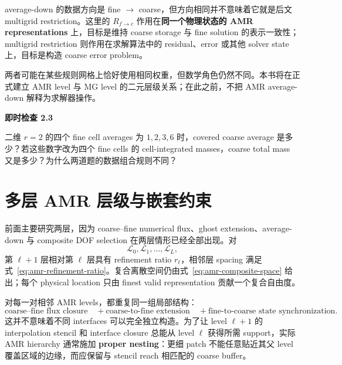 average-down 的数据方向是 fine $\rightarrow$ coarse，但方向相同并不意味着它就是后文 multigrid restriction。这里的 $R_{f\rightarrow c}$ 作用在\textbf{同一个物理状态的 AMR representations} 上，目标是维持 coarse storage 与 fine solution 的表示一致性；multigrid restriction 则作用在求解算法中的 residual、error 或其他 solver state 上，目标是构造 coarse error problem。

两者可能在某些规则网格上恰好使用相同权重，但数学角色仍然不同。本书将在正式建立 AMR level 与 MG level 的二元层级关系；在此之前，不把 AMR average-down 解释为求解器操作。

\begin{checkpointbox}
\textbf{即时检查 2.3}

二维 $r=2$ 的四个 fine cell averages 为 $1,2,3,6$ 时，covered coarse average 是多少？若这些数字改为四个 fine cells 的 cell-integrated masses，coarse total mass 又是多少？为什么两道题的数据组合规则不同？
\end{checkpointbox}

\section{多层 AMR 层级与嵌套约束}
\label{sec:amr-multilevel-hierarchy}

前面主要研究两层，因为 coarse--fine numerical flux、ghost extension、average-down 与 composite DOF selection 在两层情形已经全部出现。对
\begin{equation}
\mathcal L_0,\mathcal L_1,\ldots,\mathcal L_L,
\end{equation}
第 $\ell+1$ 层相对第 $\ell$ 层具有 refinement ratio $r_\ell$，相邻层 spacing 满足式~\eqref{eq:amr-refinement-ratio}。复合离散空间仍由式~\eqref{eq:amr-composite-space} 给出；每个 physical location 只由 finest valid representation 贡献一个复合自由度。

对每一对相邻 AMR levels，都重复同一组局部结构：
\begin{equation}
\boxed{
\text{coarse--fine flux closure}
\quad+
\text{coarse-to-fine extension}
\quad+
\text{fine-to-coarse state synchronization}.
}
\label{eq:amr-adjacent-level-operations}
\end{equation}
这并不意味着不同 interfaces 可以完全独立构造。为了让 level $\ell+1$ 的 interpolation stencil 和 interface closure 总能从 level $\ell$ 获得所需 support，实际 AMR hierarchy 通常施加 \textbf{proper nesting}：更细 patch 不能任意贴近其父 level 覆盖区域的边缘，而应保留与 stencil reach 相匹配的 coarse buffer。

